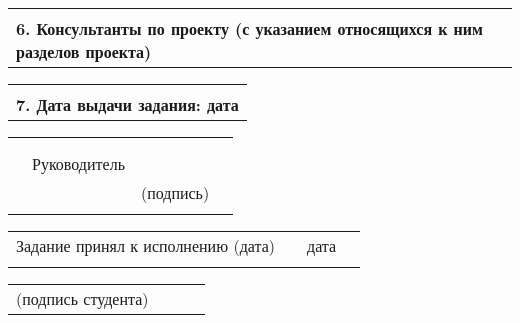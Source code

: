 \documentclass[12pt, А4]{article} %
\begin{document}
\begin{FlushLeft}
    \begin{tabular}{p{17.25cm}} %
        \vspace{1pt} \hline  \\
        \textsf{\textbf{6. Консультанты по проекту (с указанием относящихся к ним разделов проекта)}} \vspace{1pt} \hline \\
    \end{tabular} %

    \begin{tabular}{p{17.25cm}} %
        \vspace{1pt} \hline  \\
        \textsf{\textbf{7. Дата выдачи задания: дата}} \vspace{1pt} \hline \\
    \end{tabular} %

    \begin{tabular}{p{4.2cm} p{3.8cm} p{6.0cm} p{2.0cm}} %
        & & & 
        \\ %
        & & & 
        \\ %
        & \fontsize{14}{17.5} \textrm{Руководитель} & 
        \vspace{1pt} \hline & 
        \\ %
        & & \centering \fontsize{12}{15} \textsf{(подпись)} & 
        \\ %
        & & &
    \end{tabular} %


\fontsize{12}{15}


    \begin{tabular}{p{7.5cm} p{0.5cm} p{6.0cm} p{2.0cm}} %
        \textsf{Задание принял к исполнению (дата)} & &
        \centering \textsf{дата} \vspace{1pt} \hline & 
        \\ %
        & & & %
    \end{tabular} %

    \begin{tabular}{p{4.0cm} p{0.2cm} p{9.8cm} p{2.0cm}} %
        \textsf{(подпись студента)} & &
        \vspace{1pt} \hline & 
        \\ %
    \end{tabular} %


\end{FlushLeft} %
\end{document}
